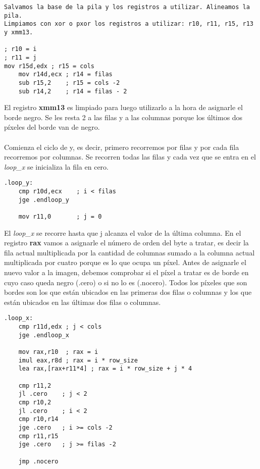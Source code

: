 \documentclass[a4paper]{article}
\begin{document}
 \begin{codesnippet}
\begin{verbatim}
Salvamos la base de la pila y los registros a utilizar. Alineamos la pila.
Limpiamos con xor o pxor los registros a utilizar: r10, r11, r15, r13 y xmm13.

; r10 = i
; r11 = j
mov r15d,edx ; r15 = cols
	mov r14d,ecx ; r14 = filas
	sub r15,2 	 ; r15 = cols -2 
	sub r14,2 	 ; r14 = filas - 2 
\end{verbatim}
\end{codesnippet}

\indent El registro \textbf{xmm13} es limpiado para luego utilizarlo a la hora de asignarle el borde negro. Se les resta 2 a las filas y a las columnas porque los \'ultimos dos p\'ixeles del borde van de negro.\\
\\
\indent Comienza el ciclo de y, es decir, primero recorremos por filas y por cada fila recorremos por columnas. Se recorren todas las filas y cada vez que se entra en el \textit{loop_x} se inicializa la fila en cero.
 \begin{codesnippet}
\begin{verbatim}
.loop_y:
    cmp r10d,ecx 	; i < filas 
    jge .endloop_y
	
    mov r11,0 		; j = 0
\end{verbatim}
\end{codesnippet}

\indent El \textit{loop_x} se recorre hasta que j alcanza el valor de la \'ultima columna. En el registro \textbf{rax} vamos a asignarle el n\'umero de orden del byte a tratar, es decir la fila actual multiplicada por la cantidad de columnas sumado a la columna actual multiplicada por cuatro porque es lo que ocupa un p\'ixel. 
Antes de asignarle el nuevo valor a la imagen, debemos comprobar si el p\'ixel a tratar es de borde en cuyo caso queda negro (.cero) o si no lo es (.nocero). Todos los p\'ixeles que son bordes son los que est\'an ubicados en las primeras dos filas o columnas y los que est\'an ubicados en las \'ultimas dos filas o columnas.
 \begin{codesnippet}
\begin{verbatim}
.loop_x:
    cmp r11d,edx ; j < cols 
    jge .endloop_x

    mov rax,r10  ; rax = i
    imul eax,r8d ; rax = i * row_size 
    lea rax,[rax+r11*4] ; rax = i * row_size + j * 4

    cmp r11,2   
    jl .cero    ; j < 2
    cmp r10,2 
    jl .cero    ; i < 2
    cmp r10,r14
    jge .cero   ; i >= cols -2
    cmp r11,r15
    jge .cero   ; j >= filas -2

    jmp .nocero
\end{verbatim}
\end{codesnippet}
\end{document}
